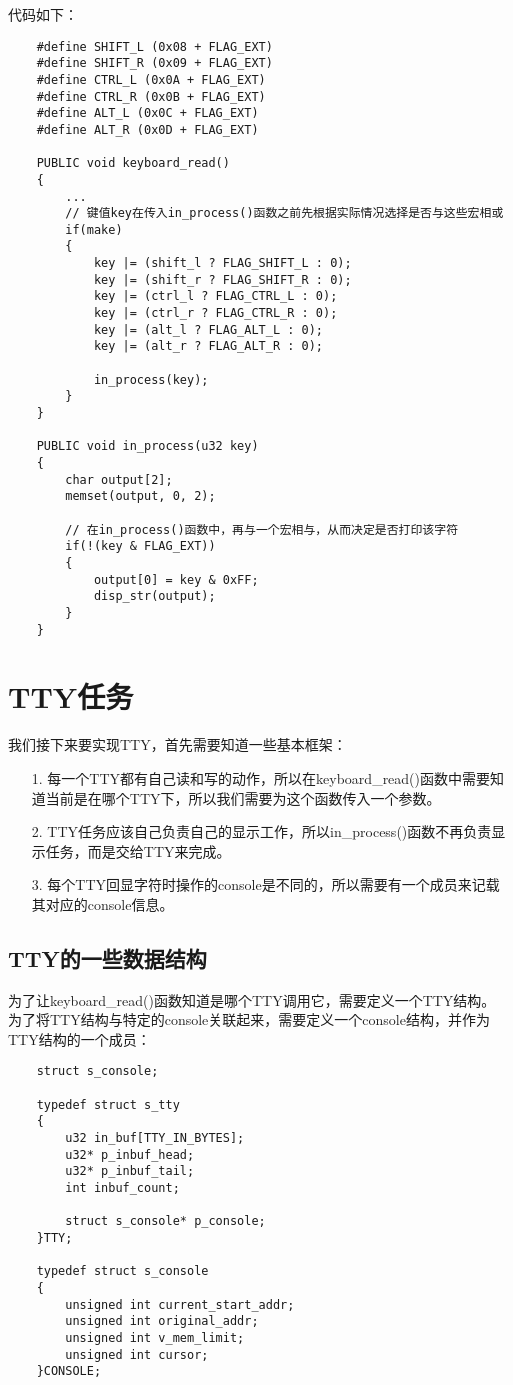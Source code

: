 \documentclass[a4paper,left=2.5cm,right=2.5cm,11pt]{article}
\begin{document}
	代码如下：
	\begin{lstlisting}
	#define SHIFT_L (0x08 + FLAG_EXT)
	#define SHIFT_R (0x09 + FLAG_EXT)
	#define CTRL_L (0x0A + FLAG_EXT)
	#define CTRL_R (0x0B + FLAG_EXT)
	#define ALT_L (0x0C + FLAG_EXT)
	#define ALT_R (0x0D + FLAG_EXT)

	PUBLIC void keyboard_read()
	{
		...
		// 键值key在传入in_process()函数之前先根据实际情况选择是否与这些宏相或
		if(make)
		{
			key |= (shift_l ? FLAG_SHIFT_L : 0);
			key |= (shift_r ? FLAG_SHIFT_R : 0);
			key |= (ctrl_l ? FLAG_CTRL_L : 0);
			key |= (ctrl_r ? FLAG_CTRL_R : 0);
			key |= (alt_l ? FLAG_ALT_L : 0);
			key |= (alt_r ? FLAG_ALT_R : 0);

			in_process(key);
		}
	}

	PUBLIC void in_process(u32 key)
	{
		char output[2];
		memset(output, 0, 2);

		// 在in_process()函数中，再与一个宏相与，从而决定是否打印该字符
		if(!(key & FLAG_EXT))
		{
			output[0] = key & 0xFF;
			disp_str(output);
		}
	}
	\end{lstlisting}

\section{TTY任务}
	我们接下来要实现TTY，首先需要知道一些基本框架：
	\begin{itemize}
		\item[1.] 每一个TTY都有自己读和写的动作，所以在keyboard\_read()函数中需要知道当前是在哪个TTY下，所以我们需要为这个函数传入一个参数。
		\item[2.] TTY任务应该自己负责自己的显示工作，所以in\_process()函数不再负责显示任务，而是交给TTY来完成。
		\item[3.] 每个TTY回显字符时操作的console是不同的，所以需要有一个成员来记载其对应的console信息。
	\end{itemize}

\subsection{TTY的一些数据结构}
	为了让keyboard\_read()函数知道是哪个TTY调用它，需要定义一个TTY结构。
	为了将TTY结构与特定的console关联起来，需要定义一个console结构，并作为TTY结构的一个成员：
	\begin{lstlisting}
	struct s_console;

	typedef struct s_tty
	{
		u32 in_buf[TTY_IN_BYTES];
		u32* p_inbuf_head;
		u32* p_inbuf_tail;
		int inbuf_count;

		struct s_console* p_console;
	}TTY;

	typedef struct s_console
	{
		unsigned int current_start_addr;
		unsigned int original_addr;
		unsigned int v_mem_limit;
		unsigned int cursor;
	}CONSOLE;
	\end{lstlisting}
\end{document}
